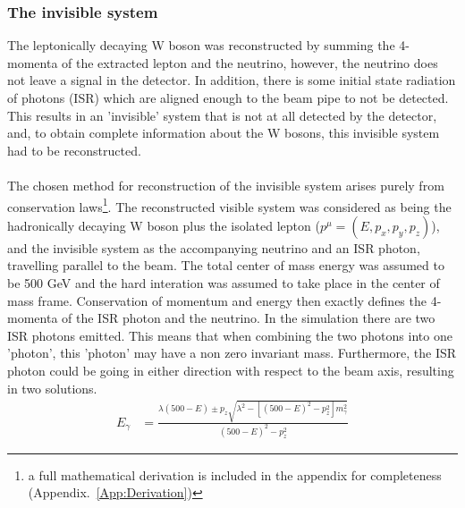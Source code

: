 \subsubsection{The invisible system}
\label{SUBSUBSEC:ISRImplementation}
The leptonically decaying W boson was reconstructed by summing the 4-momenta of the extracted lepton and the neutrino, however, the neutrino does not leave a signal in the detector. In addition, there is some initial state radiation of photons (ISR) which are aligned enough to the beam pipe to not be  detected. This results in an 'invisible' system that is not at all detected by the detector, and, to obtain complete information about the W bosons, this invisible system had to be reconstructed.
\\\\
The chosen method for reconstruction of the invisible system arises purely from conservation laws\footnote{ a full mathematical derivation is included in the appendix for completeness (Appendix.~\ref{App:Derivation})}. The reconstructed visible system was considered as being the hadronically decaying W boson plus the isolated lepton (${p}^{\mu} = ( E,  {p}_{x}, {p}_{y}, {p}_{z})$), and the invisible system as the accompanying neutrino and an ISR photon, travelling parallel to the beam. The total center of mass energy was assumed to be 500 GeV and the hard interation was assumed to take place in the center of mass frame. Conservation of momentum and energy then exactly defines the 4-momenta of the ISR photon and the neutrino. In the simulation there are two ISR photons emitted. This means that when combining the two photons into one 'photon', this 'photon' may have a non zero invariant mass. Furthermore, the ISR photon could be going in either direction with respect to the beam axis, resulting in two solutions.
\begin{align}
\label{EQ:Full}
{E}_{\gamma}    &= \frac{{\lambda}(500 - E)  \pm {p}_{z}\sqrt{ {\lambda}^{2} - [{(500 - E)}^{2} -{p}_{z}^{2}]{m}_{\gamma}^{2}}}{{(500 - E)}^{2} -   {p}_{z}^{2}}
   \end{align}

